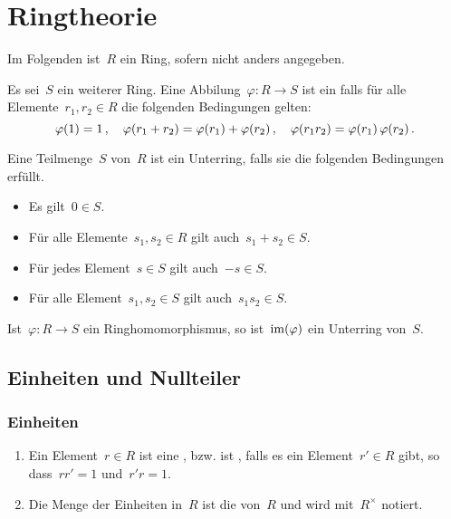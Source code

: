 \chapter{Ringtheorie}


\begin{convention}
  Im Folgenden ist~$R$ ein Ring, sofern nicht anders angegeben.
\end{convention}


\begin{definition}
  Es sei~$S$ ein weiterer Ring.
  Eine Abbilung~$\varphi \colon R \to S$ ist ein  falls für alle Elemente~$r_1, r_2 \in R$ die folgenden Bedingungen gelten:
  \[
    \varphi(1) = 1 \,,
    \quad
    \varphi(r_1 + r_2) = \varphi(r_1) + \varphi(r_2) \,,
    \quad
    \varphi(r_1 r_2) = \varphi(r_1) \, \varphi(r_2) \,.
  \]
\end{definition}

\begin{definition}
  Eine Teilmenge~$S$ von~$R$ ist ein Unterring, falls sie die folgenden Bedingungen erfüllt.
  \begin{itemize}
    \item
      Es gilt~$0 \in S$.
    \item
      Für alle Elemente~$s_1, s_2 \in R$ gilt auch~$s_1 + s_2 \in S$.
    \item
      Für jedes Element~$s \in S$ gilt auch~$-s \in S$.
    \item
      Für alle Element~$s_1, s_2 \in S$ gilt auch~$s_1 s_2 \in S$.
  \end{itemize}
\end{definition}

\begin{example}
  Ist~$\varphi \colon R \to S$ ein Ringhomomorphismus, so ist~$\operatorname{im}(\varphi)$ ein Unterring von~$S$.
\end{example}





\section{Einheiten und Nullteiler}



\subsection{Einheiten}

\begin{definition}
  \leavevmode
  \begin{enumerate}
    \item
      Ein Element~$r \in R$ ist eine , bzw. ist , falls es ein Element~$r' \in R$ gibt, so dass~$r r' = 1$ und~$r' r = 1$.
    \item
      Die Menge der Einheiten in~$R$ ist die  von~$R$ und wird mit~$R^\times$ notiert.
  \end{enumerate}
\end{definition}

